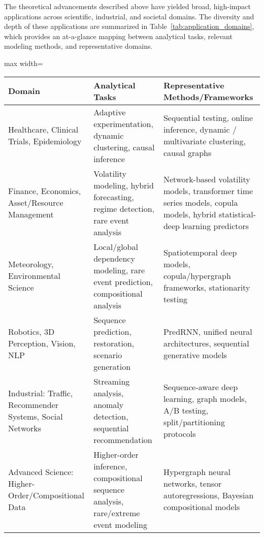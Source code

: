 \documentclass[sigconf]{acmart}
\begin{document}
The theoretical advancements described above have yielded broad, high-impact applications across scientific, industrial, and societal domains. The diversity and depth of these applications are summarized in Table~\ref{tab:application_domains}, which provides an at-a-glance mapping between analytical tasks, relevant modeling methods, and representative domains.

\begin{table*}[htbp]
\centering
\caption{Representative Application Domains and Associated Analytical Frameworks}
\label{tab:application_domains}
\begin{adjustbox}{max width=\textwidth}
\begin{tabular}{lll}
\toprule
\textbf{Domain} & \textbf{Analytical Tasks} & \textbf{Representative Methods/Frameworks} \\
\midrule
Healthcare, Clinical Trials, Epidemiology 
    & Adaptive experimentation, dynamic clustering, causal inference 
    & Sequential testing, online inference, dynamic / multivariate clustering, causal graphs \cite{ref24,ref25,ref30,ref81,ref86} \\
Finance, Economics, Asset/Resource Management 
    & Volatility modeling, hybrid forecasting, regime detection, rare event analysis 
    & Network-based volatility models, transformer time series models, copula models, hybrid statistical-deep learning predictors \cite{ref2,ref7,ref8,ref10,ref16,ref59,ref60} \\
Meteorology, Environmental Science 
    & Local/global dependency modeling, rare event prediction, compositional analysis 
    & Spatiotemporal deep models, copula/hypergraph frameworks, stationarity testing \cite{ref32,ref35,ref58,ref59,ref79} \\
Robotics, 3D Perception, Vision, NLP 
    & Sequence prediction, restoration, scenario generation 
    & PredRNN, unified neural architectures, sequential generative models \cite{ref37,ref39,ref40,ref73,ref74} \\
Industrial: Traffic, Recommender Systems, Social Networks 
    & Streaming analysis, anomaly detection, sequential recommendation 
    & Sequence-aware deep learning, graph models, A/B testing, split/partitioning protocols \cite{ref2,ref9,ref47,ref58,ref85,ref87} \\
Advanced Science: Higher-Order/Compositional Data 
    & Higher-order inference, compositional sequence analysis, rare/extreme event modeling 
    & Hypergraph neural networks, tensor autoregressions, Bayesian compositional models \cite{ref58,ref59,ref60,ref61,ref65,ref74} \\
\bottomrule
\end{tabular}
\end{adjustbox}
\end{table*}
\end{document}
